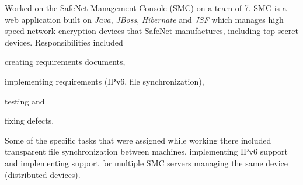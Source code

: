 \documentclass[a4paper,margin,line]{resume}
\newcommand{\rurl}[1]{\hfill {\footnotesize \url{#1}}}
\newcommand{\rdate}[1]{\hfill {\small #1}}
\renewcommand{\employer}[5]{\item[#1] - #2 \rdate{#3} \\* #4 \rurl{#5} \\*}
\begin{document}
\begin{resume}
\begin{asparadesc}
		\small
		Worked on the SafeNet Management Console (SMC) on a team of 7. SMC is a web application built on \emph{Java}, \emph{JBoss}, \emph{Hibernate} and \emph{JSF} which manages high speed network encryption devices that SafeNet manufactures, including top-secret devices. Responsibilities included \begin{inparaenum} \item creating requirements documents, \item implementing requirements (IPv6, file synchronization), \item testing and \item fixing defects. \end{inparaenum} Some of the specific tasks that were assigned while working there included transparent file synchronization between machines, implementing IPv6 support and implementing support for multiple SMC servers managing the same device (distributed devices).
		\normalsize
%
%		
	\end{asparadesc}


\end{resume}
\end{document}

